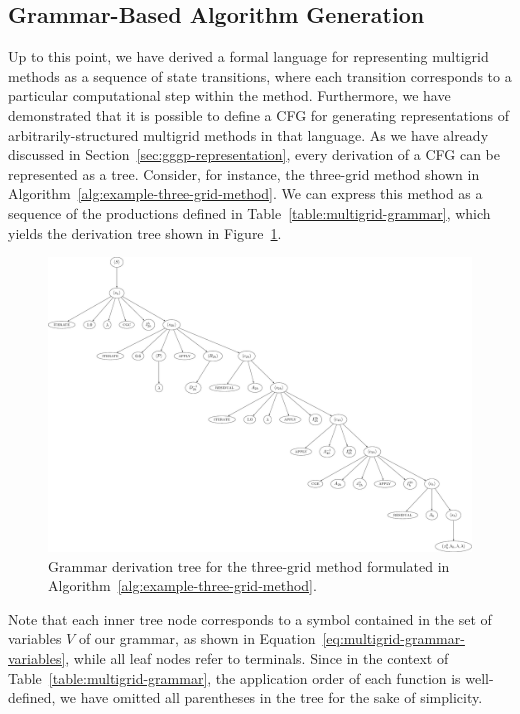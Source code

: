 \subsection{Grammar-Based Algorithm Generation}
\label{sec:grammar-based-algorithm-generation}
Up to this point, we have derived a formal language for representing multigrid methods as a sequence of state transitions, where each transition corresponds to a particular computational step within the method.
Furthermore, we have demonstrated that it is possible to define a CFG for generating representations of arbitrarily-structured multigrid methods in that language.
As we have already discussed in Section~\ref{sec:gggp-representation}, every derivation of a CFG can be represented as a tree.
Consider, for instance, the three-grid method shown in Algorithm~\ref{alg:example-three-grid-method}.
We can express this method as a sequence of the productions defined in Table~\ref{table:multigrid-grammar}, which yields the derivation tree shown in Figure~\ref{fig:example-three-grid-method-derivation-tree}.
\begin{figure}
	\centering
	\includegraphics[width=\textwidth]{figures/trees/three_grid_method_grammar_tree.pdf}
	\caption{Grammar derivation tree for the three-grid method formulated in Algorithm~\ref{alg:example-three-grid-method}.}
	\label{fig:example-three-grid-method-derivation-tree}
\end{figure}
Note that each inner tree node corresponds to a symbol contained in the set of variables $V$ of our grammar, as shown in Equation~\eqref{eq:multigrid-grammar-variables}, while all leaf nodes refer to terminals.
Since in the context of Table~\ref{table:multigrid-grammar}, the application order of each function is well-defined, we have omitted all parentheses in the tree for the sake of simplicity.

